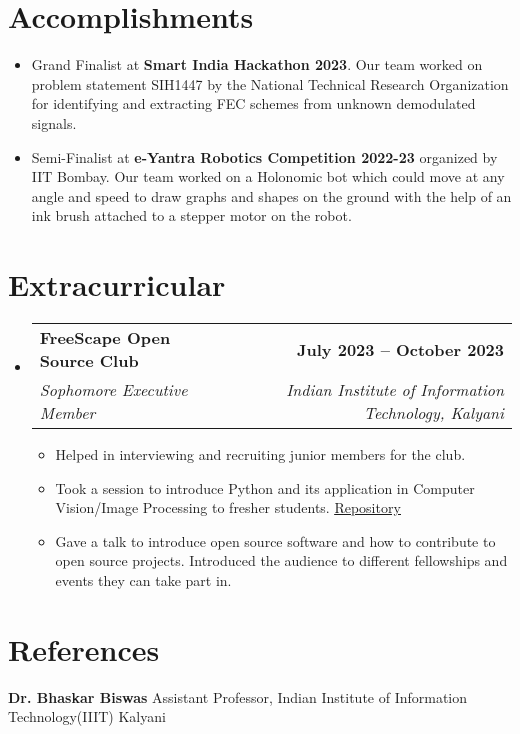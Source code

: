 \documentclass[letterpaper,11pt]{article}
\makeatletter
\newcommand{\resumeItem}[1]{
  \item\small{
    {#1 \vspace{-2pt}}
  }
}
\newcommand{\resumeSubheading}[4]{
  \vspace{-2pt}\item
    \begin{tabular*}{1.0\textwidth}[t]{l@{\extracolsep{\fill}}r}
      \textbf{#1} & \textbf{\small #2} \\
      \textit{\small#3} & \textit{\small #4} \\
    \end{tabular*}\vspace{-7pt}
}
\newcommand{\resumeSubHeadingListStart}{\begin{itemize}[leftmargin=0.0in, label={}]}
\newcommand{\resumeSubHeadingListEnd}{\end{itemize}}
\newcommand{\resumeItemListStart}{\begin{itemize}}
\newcommand{\resumeItemListEnd}{\end{itemize}\vspace{-5pt}}
\makeatother
\begin{document}
\section{Accomplishments}
\resumeItemListStart
    \resumeItem{Grand Finalist at \textbf{Smart India Hackathon 2023}. Our team 
    worked on problem statement SIH1447 by the National Technical Research Organization for identifying and extracting FEC schemes from unknown demodulated signals.}
    \resumeItem{Semi-Finalist at \textbf{e-Yantra Robotics Competition 2022-23} organized by IIT Bombay. Our team worked on a Holonomic bot which could move at any angle and speed to draw graphs and shapes on the ground with the help of an ink brush attached to a stepper motor on the robot.}
\resumeItemListEnd

\section{Extracurricular}
\resumeSubHeadingListStart
    \resumeSubheading{FreeScape Open Source Club}{July 2023 -- October 2023}{Sophomore Executive Member}{Indian Institute of Information Technology, Kalyani}
        \resumeItemListStart
            \resumeItem{Helped in interviewing and recruiting junior members for the club.}
            \resumeItem{Took a session to introduce Python and its application in Computer Vision/Image Processing to fresher students. \href{https://github.com/MashyBasker/invcloak}{\underline{Repository}}}
            \resumeItem{Gave a talk to introduce open source software and how to contribute to open source projects. Introduced the audience to different fellowships and events they can take part in.}
        \resumeItemListEnd
\resumeSubHeadingListEnd
\section{References}
\textbf{Dr. Bhaskar Biswas} Assistant Professor, Indian Institute of Information Technology(IIIT) Kalyani
\end{document}
